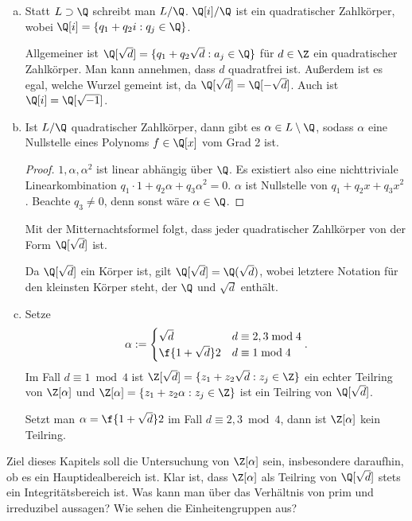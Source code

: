 \begin{ex} \label{4.3}
	\begin{enumerate}[a)]
		\item
			Statt $L \supset \Q$ schreibt man $L / \Q$.
			$\Q[i] / \Q$ ist ein quadratischer Zahlkörper, wobei $\Q[i] = \{ q_1 + q_2 i : q_j \in \Q \}$.

			Allgemeiner ist $\Q[\sqrt d] = \{ q_1 + q_2 \sqrt d : a_j \in \Q \}$ für $d \in \Z$ ein quadratischer Zahlkörper.
			Man kann annehmen, dass $d$ quadratfrei ist.
			Außerdem ist es egal, welche Wurzel gemeint ist, da $\Q[\sqrt d] = \Q[-\sqrt d]$.
			Auch ist $\Q[i] = \Q[\sqrt{-1}]$.
		\item
			Ist $L / \Q$ quadratischer Zahlkörper, dann gibt es $\alpha \in L \setminus \Q$, sodass $\alpha$ eine Nullstelle eines Polynoms $f \in \Q[x]$ vom Grad 2 ist.
			\begin{proof}
				$1, \alpha, \alpha^2$ ist linear abhängig über $\Q$.
				Es existiert also eine nichttriviale Linearkombination $q_1 \cdot 1 + q_2 \alpha + q_3 \alpha^2 = 0$.
				$\alpha$ ist Nullstelle von $q_1 + q_2 x + q_3 x^2$.
				Beachte $q_3 \neq 0$, denn sonst wäre $\alpha \in \Q$.
			\end{proof}
			Mit der Mitternachtsformel folgt, dass jeder quadratischer Zahlkörper von der Form $\Q[\sqrt d]$ ist.

			Da $\Q[\sqrt d]$ ein Körper ist, gilt $\Q[\sqrt d] = \Q(\sqrt d)$, wobei letztere Notation für den kleinsten Körper steht, der $\Q$ und $\sqrt{d}$ enthält.
		\item
			Setze
			\[
				\alpha := \begin{cases}
					\sqrt d & d \equiv 2, 3 \bmod 4 \\
					\f{1 + \sqrt d}2 & d \equiv 1 \bmod 4
				\end{cases}.
			\]
			Im Fall $d \equiv 1 \bmod 4$ ist $\Z[\sqrt d] = \{ z_1 + z_2 \sqrt{d} : z_j \in \Z \}$ ein echter Teilring von $\Z[\alpha]$ und $\Z[\alpha] = \{z_1 + z_2 \alpha : z_j \in \Z \}$ ist ein Teilring von $\Q[\sqrt d]$.

			Setzt man $\alpha = \f{1 + \sqrt d}2$ im Fall $d \equiv 2,3 \bmod 4$, dann ist $\Z[\alpha]$ kein Teilring.
	\end{enumerate}
\end{ex}

Ziel dieses Kapitels soll die Untersuchung von $\Z[\alpha]$ sein, insbesondere daraufhin, ob es ein Hauptidealbereich ist.
Klar ist, dass $\Z[\alpha]$ als Teilring von $\Q[\sqrt{d}]$ stets ein Integritätsbereich ist.
Was kann man über das Verhältnis von prim und irreduzibel aussagen?
Wie sehen die Einheitengruppen aus?

